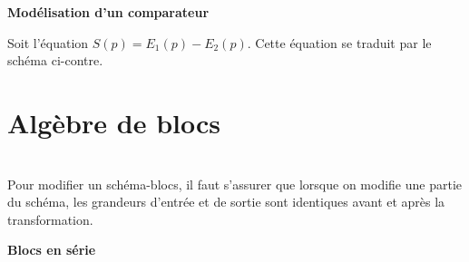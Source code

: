 \begin{defi} \textbf{\textsf{Modélisation d'un comparateur}} ~\\
\noindent \begin{minipage}[c]{.65\linewidth}
Soit l'équation $S(p)=E_1(p)-E_2(p)$. Cette équation se traduit par le schéma ci-contre.
\end{minipage} \hfill
\begin{minipage}[c]{.3\linewidth}
\begin{center}

\end{center}
\end{minipage}


\end{defi}


\section{Algèbre de blocs}


\begin{warn}~\\
Pour modifier un schéma-blocs, il faut s'assurer que lorsque on modifie une partie du schéma, les grandeurs d'entrée et de sortie sont identiques avant et après la transformation.
\end{warn}

\begin{resultat} \textbf{\textsf{Blocs en série}}~\\

\vspace{-.6cm}
\begin{center}

\end{center}

\end{resultat}



